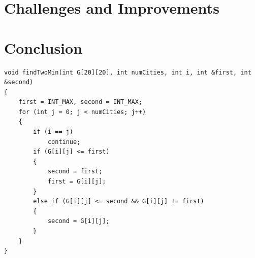 \documentclass[a4paper]{article}
\begin{document}
\section{Challenges and Improvements} %
\section{Conclusion}

\begin{verbatim}
void findTwoMin(int G[20][20], int numCities, int i, int &first, int &second)
{
    first = INT_MAX, second = INT_MAX;
    for (int j = 0; j < numCities; j++)
    {
        if (i == j)
            continue;
        if (G[i][j] <= first)
        {
            second = first;
            first = G[i][j];
        }
        else if (G[i][j] <= second && G[i][j] != first)
        {
            second = G[i][j];
        }
    }
}
\end{verbatim}
\end{document}
